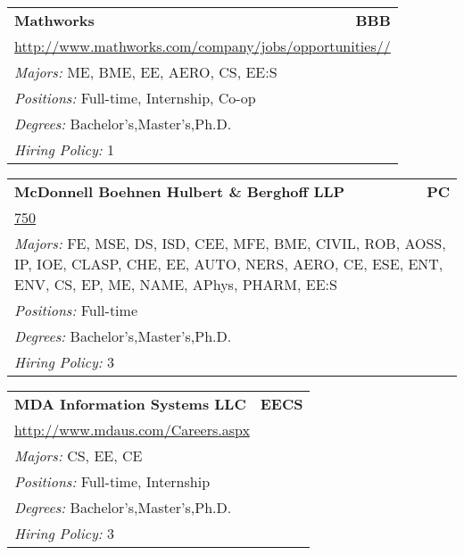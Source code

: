 \documentclass[twoside]{article}
\begin{document}
\begin{center}
\begin{multicols}{3}
\begin{FlushLeft}
\begin{minipage}{\columnwidth}\begin{tabularx}{.95\columnwidth}{Xr}
                 {\Large\bf Mathworks} & {\Large\bf BBB}\\
    \multicolumn{2}{p{.95\columnwidth}}{\url{http://www.mathworks.com/company/jobs/opportunities//}}\\
    \multicolumn{2}{p{.95\columnwidth}}{\emph{Majors:} ME, BME, EE, AERO, CS, EE:S}\\
    \multicolumn{2}{p{.95\columnwidth}}{\emph{Positions:} Full-time, Internship, Co-op}\\
    \multicolumn{2}{p{.95\columnwidth}}{\emph{Degrees:} Bachelor's,Master's,Ph.D.}\\
    \multicolumn{2}{p{.95\columnwidth}}{\emph{Hiring Policy:} 1}\\
    \end{tabularx}
    
\end{minipage}
 
\begin{minipage}{\columnwidth}\begin{tabularx}{.95\columnwidth}{Xr}
                 {\Large\bf McDonnell Boehnen Hulbert \& Berghoff LLP} & {\Large\bf PC}\\
    \multicolumn{2}{p{.95\columnwidth}}{\url{750}}\\
    \multicolumn{2}{p{.95\columnwidth}}{\emph{Majors:} FE, MSE, DS, ISD, CEE, MFE, BME, CIVIL, ROB, AOSS, IP, IOE, CLASP, CHE, EE, AUTO, NERS, AERO, CE, ESE, ENT, ENV, CS, EP, ME, NAME, APhys, PHARM, EE:S}\\
    \multicolumn{2}{p{.95\columnwidth}}{\emph{Positions:} Full-time}\\
    \multicolumn{2}{p{.95\columnwidth}}{\emph{Degrees:} Bachelor's,Master's,Ph.D.}\\
    \multicolumn{2}{p{.95\columnwidth}}{\emph{Hiring Policy:} 3}\\
    \end{tabularx}
    
\end{minipage}
 
\begin{minipage}{\columnwidth}\begin{tabularx}{.95\columnwidth}{Xr}
                 {\Large\bf MDA Information Systems LLC} & {\Large\bf EECS}\\
    \multicolumn{2}{p{.95\columnwidth}}{\url{http://www.mdaus.com/Careers.aspx}}\\
    \multicolumn{2}{p{.95\columnwidth}}{\emph{Majors:} CS, EE, CE}\\
    \multicolumn{2}{p{.95\columnwidth}}{\emph{Positions:} Full-time, Internship}\\
    \multicolumn{2}{p{.95\columnwidth}}{\emph{Degrees:} Bachelor's,Master's,Ph.D.}\\
    \multicolumn{2}{p{.95\columnwidth}}{\emph{Hiring Policy:} 3}\\
    \end{tabularx}
    

\end{minipage}
\end{FlushLeft}
\end{multicols}
\end{center}
\end{document}
